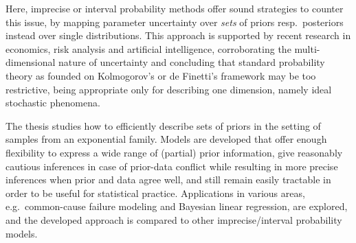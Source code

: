 %
%
%

Here, imprecise or interval probability methods offer sound strategies to counter this issue,
by mapping parameter uncertainty over \emph{sets} of priors resp.\ posteriors instead over single distributions.
This approach is supported by recent research in economics, risk analysis and artificial intelligence,
corroborating the multi-dimensional nature of uncertainty and concluding that standard probability theory
as founded on Kolmogorov's or de Finetti's framework may be too restrictive,
being appropriate only for describing one dimension, namely ideal stochastic phenomena.

The thesis studies how to efficiently describe sets of priors in the setting of samples from an exponential family. 
Models are developed that offer enough flexibility to express a wide range of (partial) prior information,
give reasonably cautious inferences in case of prior-data conflict while resulting in more precise inferences when prior and data agree well,
and still remain easily tractable in order to be useful for statistical practice.
Applications in various areas, e.g.\ common-cause failure modeling and Bayesian linear regression, are explored,
and the developed approach is compared to other imprecise/interval probability models.
